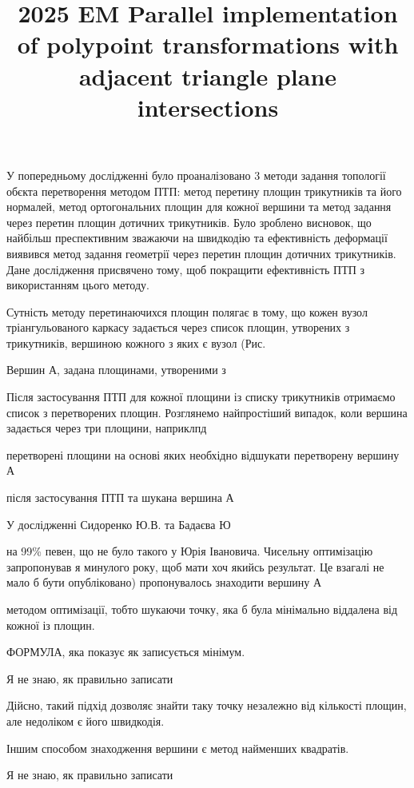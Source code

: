 \documentclass[12pt,a4paper]{article}
\begin{document}
\title{2025 EM Parallel implementation of polypoint transformations with adjacent triangle plane intersections}
\maketitle
У попередньому дослідженні було проаналізовано 3 методи задання топології обєкта перетворення методом ПТП: метод перетину площин трикутників та його нормалей, метод ортогональних площин для кожної вершини та метод задання через перетин площин дотичних трикутників. Було зроблено висновок, що найбільш преспективним зважаючи на швидкодію та ефективність деформації виявився метод задання геометрії через перетин площин дотичних трикутників. Дане дослідження присвячено тому, щоб покращити ефективність ПТП з використанням цього методу.
\par
Сутність методу перетинаючихся площин полягає в тому, що кожен вузол тріангульованого каркасу задається через список площин, утворених з трикутників, вершиною кожного з яких є вузол (Рис.
\par
Вершин А, задана площинами, утвореними з
\par
Після застосування ПТП для кожної площини із списку трикутників отримаємо список з перетворених площин. Розглянемо найпростіший випадок, коли вершина задається через три площини, наприклпд
\par
перетворені площини на основі яких необхідно відшукати перетворену вершину А
\par
після застосування ПТП та шукана вершина А
\par
У дослідженні Сидоренко Ю.В. та Бадаєва Ю
\par
на 99\% певен, що не було такого у Юрія Івановича. Чисельну оптимізацію запропонував я минулого року, щоб мати хоч якийсь результат. Це взагалі не мало б бути опубліковано) пропонувалось знаходити вершину А
\par
методом оптимізації, тобто шукаючи точку, яка б була мінімально віддалена від кожної із площин.
\par
ФОРМУЛА, яка показує як записується мінімум.
\par
Я не знаю, як правильно записати
\par
Дійсно, такий підхід дозволяє знайти таку точку незалежно від кількості площин, але недоліком є його швидкодія.
\par
Іншим способом знаходження вершини є метод найменших квадратів.
\par
Я не знаю, як правильно записати
\par
\end{document}
